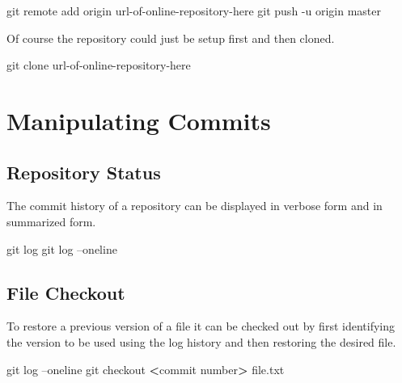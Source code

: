 \documentclass[]{book}
\newenvironment{Shaded}{\begin{snugshade}}{\end{snugshade}}
\newcommand{\FunctionTok}[1]{\textcolor[rgb]{0.00,0.00,0.00}{#1}}
\newcommand{\NormalTok}[1]{#1}
\newcommand{\OperatorTok}[1]{\textcolor[rgb]{0.81,0.36,0.00}{\textbf{#1}}}
\begin{document}
\begin{Shaded}
\begin{Highlighting}[]
\FunctionTok{git}\NormalTok{ remote add origin url-of-online-repository-here}
\FunctionTok{git}\NormalTok{ push -u origin master}
\end{Highlighting}
\end{Shaded}

Of course the repository could just be setup first and then cloned.

\begin{Shaded}
\begin{Highlighting}[]
\FunctionTok{git}\NormalTok{ clone url-of-online-repository-here}
\end{Highlighting}
\end{Shaded}

\hypertarget{manipulating-commits}{%
\section{Manipulating Commits}\label{manipulating-commits}}

\hypertarget{repository-status}{%
\subsection{Repository Status}\label{repository-status}}

The commit history of a repository can be displayed in verbose form and in summarized form.

\begin{Shaded}
\begin{Highlighting}[]
\FunctionTok{git}\NormalTok{ log}
\FunctionTok{git}\NormalTok{ log --oneline}
\end{Highlighting}
\end{Shaded}

\hypertarget{file-checkout}{%
\subsection{File Checkout}\label{file-checkout}}

To restore a previous version of a file it can be checked out by first identifying the version to be used using the log history and then restoring the desired file.

\begin{Shaded}
\begin{Highlighting}[]
\FunctionTok{git}\NormalTok{ log --oneline}
\FunctionTok{git}\NormalTok{ checkout }\OperatorTok{<}\NormalTok{commit number}\OperatorTok{>}\NormalTok{ file.txt}
\end{Highlighting}
\end{Shaded}
\end{document}
